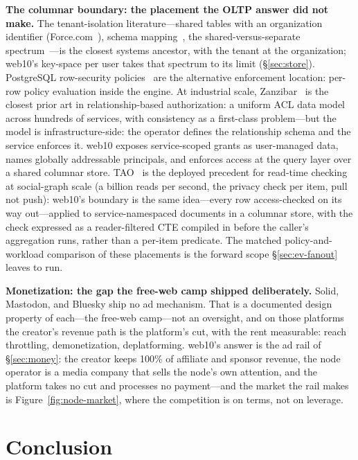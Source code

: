 \documentclass[sigconf, nonacm]{acmart}
\begin{document}
\textbf{The columnar boundary: the placement the OLTP answer did not
make.} The tenant-isolation literature---shared tables with an
organization identifier (Force.com~\cite{force2009}), schema
mapping~\cite{aulbach2008}, the shared-versus-separate
spectrum~\cite{jacobs2007}---is the closest systems ancestor, with the
tenant at the organization; web10's key-space per user takes that
spectrum to its limit (\S\ref{sec:store}). PostgreSQL row-security
policies~\cite{postgres-rls} are the alternative enforcement location:
per-row policy evaluation inside the engine. At industrial scale,
Zanzibar~\cite{zanzibar2019} is the closest prior art in
relationship-based authorization: a uniform ACL data model across
hundreds of services, with consistency as a first-class problem---but
the model is infrastructure-side: the operator defines the relationship
schema and the service enforces it. web10 exposes service-scoped grants
as user-managed data, names globally addressable principals, and enforces
access at the query layer over a shared columnar store. TAO~\cite{tao2013}
is the deployed precedent for read-time checking at social-graph scale
(a billion reads per second, the privacy check per item, pull not push):
web10's boundary is the same idea---every row access-checked on its way
out---applied to service-namespaced documents in a columnar store, with
the check expressed as a reader-filtered CTE compiled in before the
caller's aggregation runs, rather than a per-item predicate. The matched
policy-and-workload comparison of these placements is the forward scope
\S\ref{sec:ev-fanout} leaves to run.

\textbf{Monetization: the gap the free-web camp shipped deliberately.}
Solid, Mastodon, and Bluesky ship no ad mechanism. That is a documented
design property of each---the free-web camp---not an oversight, and on
those platforms the creator's revenue path is the platform's cut, with
the rent measurable: reach throttling, demonetization, deplatforming.
web10's answer is the ad rail of \S\ref{sec:money}: the creator keeps
100\% of affiliate and sponsor revenue, the node operator is a media
company that sells the node's own attention, and the platform takes no
cut and processes no payment---and the market the rail makes is
Figure~\ref{fig:node-market}, where the competition is on terms, not on
leverage.

\section{Conclusion}
\label{sec:concl}
\end{document}
